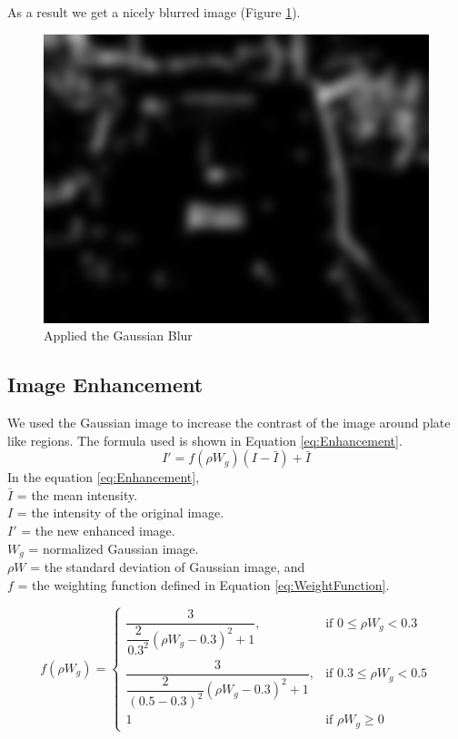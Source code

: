 \documentclass{standalone}
\begin{document}
As a result we get a nicely blurred image (Figure \ref{fig:GaussianSample}).
\begin{figure} 
	\centering
	\includegraphics[width=.8\linewidth]{./img/sample/stage3.jpg}
	\caption{Applied the Gaussian Blur} 
	\label{fig:GaussianSample}
\end{figure}

\subsection{Image Enhancement}
We used the Gaussian image to increase the contrast of the image around plate like regions. The formula used is shown in Equation \ref{eq:Enhancement}.
\begin{equation} \label{eq:Enhancement}
I' = f(\rho W_g) (I - \bar{I}) + \bar{I}
\end{equation}
In the equation \ref{eq:Enhancement},\\
$\bar{I}$ = the mean intensity. \\
$I$ = the intensity of the original image. \\
$I'$ = the new enhanced image. \\
$W_g$ = normalized Gaussian image. \\ 
$\rho W$ = the standard deviation of Gaussian image, and \\
$f$ = the weighting function defined in Equation \ref{eq:WeightFunction}.

\begin{equation} \label{eq:WeightFunction}
f(\rho W_g) = 
\begin{cases} 
	\dfrac{3}{ \dfrac{2}{0.3^2} ( \rho W_g - 0.3)^2 + 1 },
    	& \mbox{if } 0 \leq \rho W_g < 0.3  
     \\
    
    \dfrac{3}{ \dfrac{2}{(0.5 - 0.3)^2} ( \rho W_g - 0.3)^2 + 1 },
    	& \mbox{if } 0.3 \leq \rho W_g < 0.5  
     \\
        
    1	& \mbox{if } \rho W_g \geq 0
\end{cases}
\end{equation} 
\end{document}
